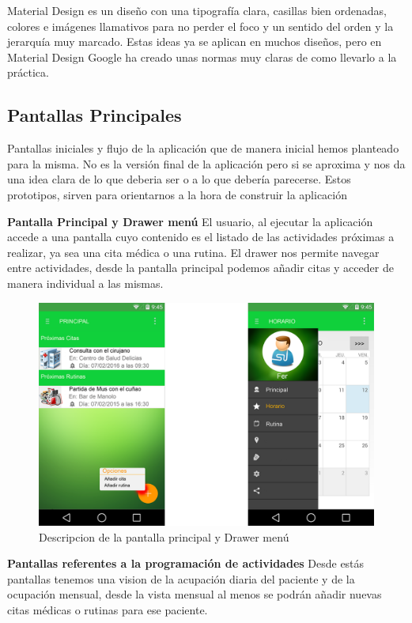 \documentclass[../pfc.tex]{subfiles}
\begin{document}
		Material Design es un diseño con una tipografía clara, casillas bien ordenadas, colores e imágenes llamativos para no perder el foco y un sentido del orden y la jerarquía muy marcado. Estas ideas ya se aplican en muchos diseños, pero en Material Design Google ha creado unas normas muy claras de como llevarlo a la práctica.
		
		\subsection{Pantallas Principales}
		
			Pantallas iniciales y flujo de la aplicación que de manera inicial hemos planteado para la misma.
			No es la versión final de la aplicación pero si se aproxima y nos da una idea clara de lo que deberia ser o a lo que debería parecerse.
			Estos prototipos, sirven para orientarnos a la hora de construir la aplicación
			
			\textbf{Pantalla Principal y Drawer menú}
			El usuario, al ejecutar la aplicación accede a una pantalla cuyo contenido es el listado de las actividades próximas a realizar, ya sea una cita médica o una rutina.
			El drawer nos permite navegar entre actividades, desde la pantalla principal podemos añadir citas y acceder de manera individual a las mismas.
			 
			
			\begin{figure}
				\centering
				\includegraphics[width=0.7\linewidth]{../images/principal_2}
				\caption[Drawer menu y Pantalla principal]{Descripcion de la pantalla principal y Drawer menú}
				\label{fig:principal}
			\end{figure}
			
			
			\textbf{Pantallas referentes a la programación de actividades}
			Desde estás pantallas tenemos una vision de la acupación diaria del paciente y de la ocupación mensual, desde la vista mensual al menos se podrán añadir nuevas citas médicas o rutinas para ese paciente.
\end{document}
